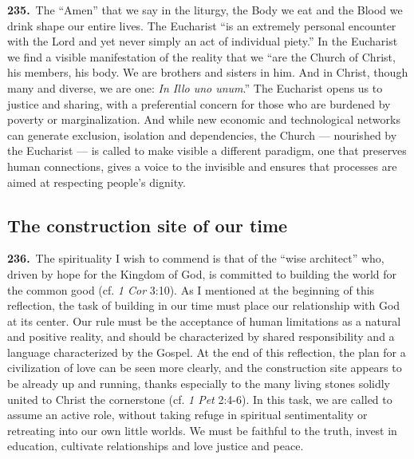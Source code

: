 \documentclass{article}
\begin{document}
\textbf{235.}\ The ``Amen'' that we say in the liturgy, the Body we eat and the Blood we drink shape our entire lives. The Eucharist ``is an extremely personal encounter with the Lord and yet never simply an act of individual piety.''\cite{n215} In the Eucharist we find a visible manifestation of the reality that we ``are the Church of Christ, his members, his body. We are brothers and sisters in him. And in Christ, though many and diverse, we are one: \emph{In Illo uno unum}.''\cite{n216} The Eucharist opens us to justice and sharing, with a preferential concern for those who are burdened by poverty or marginalization. And while new economic and technological networks can generate exclusion, isolation and dependencies, the Church --- nourished by the Eucharist --- is called to make visible a different paradigm, one that preserves human connections, gives a voice to the invisible and ensures that processes are aimed at respecting people's dignity.

\subsection{The construction site of our time}

\textbf{236.}\ The spirituality I wish to commend is that of the ``wise architect'' who, driven by hope for the Kingdom of God, is committed to building the world for the common good (cf. \emph{1 Cor} 3:10). As I mentioned at the beginning of this reflection,\cite{n217} the task of building in our time must place our relationship with God at its center. Our rule must be the acceptance of human limitations as a natural and positive reality, and should be characterized by shared responsibility and a language characterized by the Gospel. At the end of this reflection, the plan for a civilization of love can be seen more clearly, and the construction site appears to be already up and running, thanks especially to the many living stones solidly united to Christ the cornerstone (cf. \emph{1 Pet} 2:4-6). In this task, we are called to assume an active role, without taking refuge in spiritual sentimentality or retreating into our own little worlds. We must be faithful to the truth, invest in education, cultivate relationships and love justice and peace.
\end{document}
